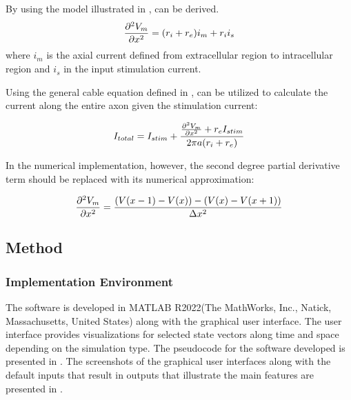 \documentclass{IEEEtran}
\begin{document}
By using the model illustrated in ,  can be derived. 
\begin{equation}
    \pdv[2]{V_m}{x} = (r_i+r_e) i_m + r_i i_s \label{eqn:cable}
\end{equation}
where $i_m$ is the axial current defined from extracellular region to intracellular region and $i_s$ in the input stimulation current. 

Using the general cable equation defined in ,  can be utilized to calculate the current along the entire axon given the stimulation current: 

\begin{equation}
    I_{total} = I_{stim} + \frac{\pdv[2]{V_m}{x} + r_eI_{stim}}{2\pi a (r_i+r_e)} \label{eqn:num} 
\end{equation}

In the numerical implementation, however, the second degree partial derivative term should be replaced with its numerical approximation: 

\begin{equation}
    \pdv[2]{V_m}{x} = \frac{(V(x-1)-V(x))-(V(x)-V(x+1))}{\Delta x^2}
    \label{eqn:current}
\end{equation}

\subsection{Method}

\subsubsection{Implementation Environment}
The software is developed in MATLAB R2022(The MathWorks, Inc., Natick, Massachusetts, United States) along with the graphical user interface. The user interface provides visualizations for selected state vectors along time and space depending on the simulation type. The pseudocode for the software developed is presented in . The screenshots of the graphical user interfaces along with the default inputs that result in outputs that illustrate the main features are presented in .


\clearpage
\end{document}
